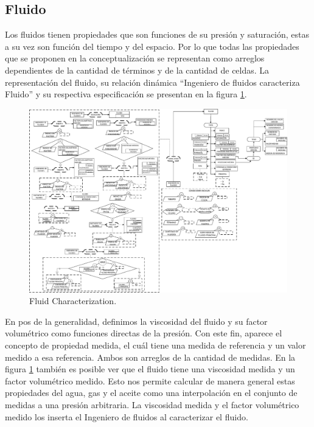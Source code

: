 \subsection{Fluido}\label{sec:PS_Phase}

Los fluidos tienen propiedades que son funciones de su presión y saturación, estas a su vez son función del tiempo y del espacio. Por lo que todas las propiedades que se proponen en la conceptualización se representan como arreglos dependientes de la cantidad de términos y de la cantidad de celdas. La representación del fluido, su relación dinámica ``Ingeniero de fluidos caracteriza Fluido'' y su respectiva especificación se presentan en la figura \ref{fig:Fluid}.\\

\begin{figure}[h]
	\centering%
	\includegraphics[width=0.9\linewidth]{Kap4/Fluid.pdf}%
	\caption{Fluid Characterization.} \label{fig:Fluid}
\end{figure}

En pos de la generalidad, definimos la viscosidad del fluido y su factor volumétrico como funciones directas de la presión. Con este fin, aparece el concepto de propiedad medida, el cuál tiene una medida de referencia y un valor medido a esa referencia. Ambos son arreglos de la cantidad de medidas. En la figura \ref{fig:Fluid} también es posible ver que el fluido tiene una viscosidad medida y un factor volumétrico medido. Esto nos permite calcular de manera general estas propiedades del agua, gas y el aceite como una interpolación en el conjunto de medidas a una presión arbitraria. La viscosidad medida y el factor volumétrico medido los inserta el Ingeniero de fluidos al caracterizar el fluido. \\

